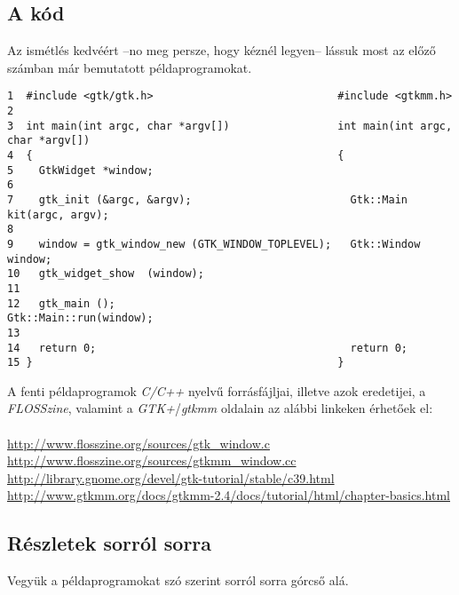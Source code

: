 \documentclass[a4paper,10pt]{article}
\begin{document}
\subsection{A kód}

Az ismétlés kedvéért --no meg persze, hogy kéznél legyen-- lássuk most az előző számban már bemutatott példaprogramokat.

\vspace{16pt}
\fontsize{8pt}{8pt}
\begin{verbatim}
1  #include <gtk/gtk.h>                             #include <gtkmm.h>
2
3  int main(int argc, char *argv[])                 int main(int argc, char *argv[])
4  {                                                {
5    GtkWidget *window;
6
7    gtk_init (&argc, &argv);                         Gtk::Main kit(argc, argv);
8
9    window = gtk_window_new (GTK_WINDOW_TOPLEVEL);   Gtk::Window window;
10   gtk_widget_show  (window);
11
12   gtk_main ();                                     Gtk::Main::run(window);
13
14   return 0;                                        return 0;
15 }                                                }
\end{verbatim} 

A fenti példaprogramok \textit{C/C++} nyelvű forrásfájljai, illetve azok eredetijei, a \textit{FLOSSzine}, valamint a \textit{GTK+}/\textit{gtkmm} oldalain az alábbi linkeken érhetőek el:
\ \\\\
\url{http://www.flosszine.org/sources/gtk_window.c}\\
\url{http://www.flosszine.org/sources/gtkmm_window.cc}\\
\url{http://library.gnome.org/devel/gtk-tutorial/stable/c39.html}\\
\url{http://www.gtkmm.org/docs/gtkmm-2.4/docs/tutorial/html/chapter-basics.html}

\subsection{Részletek sorról sorra}

Vegyük a példaprogramokat szó szerint sorról sorra górcső alá.
\end{document}
